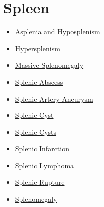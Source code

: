 \section*{Spleen}
\label{sec:organ_spleen}
\begin{itemize}[noitemsep]
  \item \hyperlink{sec:Asplenia and Hyposplenism}{Asplenia and Hyposplenism}
  \item \hyperlink{sec:Hypersplenism}{Hypersplenism}
  \item \hyperlink{sec:Massive Splenomegaly}{Massive Splenomegaly}
  \item \hyperlink{sec:Splenic Abscess}{Splenic Abscess}
  \item \hyperlink{sec:Splenic Artery Aneurysm}{Splenic Artery Aneurysm}
  \item \hyperlink{sec:Splenic Cyst}{Splenic Cyst}
  \item \hyperlink{sec:Splenic Cysts}{Splenic Cysts}
  \item \hyperlink{sec:Splenic Infarction}{Splenic Infarction}
  \item \hyperlink{sec:Splenic Lymphoma}{Splenic Lymphoma}
  \item \hyperlink{sec:Splenic Rupture}{Splenic Rupture}
  \item \hyperlink{sec:Splenomegaly}{Splenomegaly}
\end{itemize}

